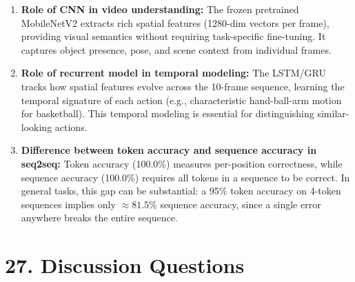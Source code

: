 \documentclass[10pt]{article}
\begin{document}
\begin{enumerate}
\item \textbf{Role of CNN in video understanding:}
The frozen pretrained MobileNetV2 extracts rich spatial features (1280-dim vectors per frame), providing 
visual semantics without requiring task-specific fine-tuning. It captures object presence, pose, and 
scene context from individual frames.

\item \textbf{Role of recurrent model in temporal modeling:}
The LSTM/GRU tracks how spatial features evolve across the 10-frame sequence, learning the temporal 
signature of each action (e.g., characteristic hand-ball-arm motion for basketball). This temporal 
modeling is essential for distinguishing similar-looking actions.

\item \textbf{Difference between token accuracy and sequence accuracy in seq2seq:}
Token accuracy (100.0\%) measures per-position correctness, while sequence accuracy (100.0\%) requires 
all tokens in a sequence to be correct. In general tasks, this gap can be substantial: a 95\% token 
accuracy on 4-token sequences implies only $\approx 81.5\%$ sequence accuracy, since a single error 
anywhere breaks the entire sequence.
\end{enumerate}

\section*{27. Discussion Questions}
\end{document}
